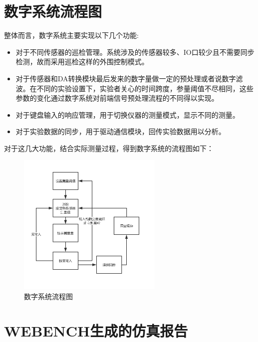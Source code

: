 \documentclass[a4paper, 11pt]{article} %
\begin{document}
\section{数字系统流程图}

整体而言，数字系统主要实现以下几个功能:

\begin{itemize}
    \item 对于不同传感器的巡检管理。系统涉及的传感器较多、IO口较少且不需要同步检测，故而采用巡检这样的外围控制模式。
    \item 对于传感器和DA转换模块最后发来的数字量做一定的预处理或者说数字滤波。在不同的实验设置下，实验者关心的时间跨度，参量阈值不尽相同，这些参数的变化通过数字系统对前端信号预处理流程的不同得以实现。
    \item 对于键盘输入的响应管理，用于切换仪器的测量模式，显示不同的测量。
    \item 对于实验数据的同步，用于驱动通信模块，回传实验数据用以分析。
\end{itemize}

对于这几大功能，结合实际测量过程，得到数字系统的流程图如下：

\begin{figure}[H]
    \centering
    \includegraphics[width = 0.618\textwidth]{digital_flow.png}
    \caption{数字系统流程图}
\end{figure}


\newpage



\newpage
\appendix
\pagestyle{empty}
\section{WEBENCH生成的仿真报告}
\label{sec:webench_report}
\end{document}
